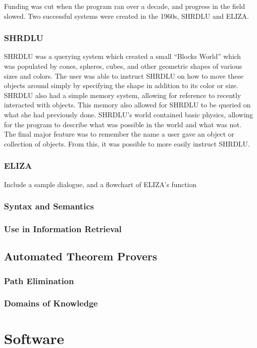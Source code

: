 \documentclass[12pt]{article}
\begin{document}
Funding was cut when the program ran over a decade, and progress in the field slowed. Two successful systems were created in the 1960s, SHRDLU and ELIZA.

\subsubsection{SHRDLU}
SHRDLU was a querying system which created a small ``Blocks World'' which was populated by cones, spheres, cubes, and other geometric shapes of various sizes and colors. \cite{winograd} The user was able to instruct SHRDLU on how to move these objects around simply by specifying the shape in addition to its color or size. SHRDLU also had a simple memory system, allowing for reference to recently interacted with objects. This memory also allowed for SHRDLU to be queried on what she had previously done. SHRDLU's world contained basic physics, allowing for the program to describe what was possible in the world and what was not. The final major feature was to remember the name a user gave an object or collection of objects. From this, it was possible to more easily instruct SHRDLU.

\subsubsection{ELIZA}

\huge{Include a sample dialogue, and a flowchart of ELIZA's function}

\subsubsection{Syntax and Semantics}
\subsubsection{Use in Information Retrieval}
\subsection{Automated Theorem Provers}
\subsubsection{Path Elimination}
\subsubsection{Domains of Knowledge}

\section{Software}
\end{document}
